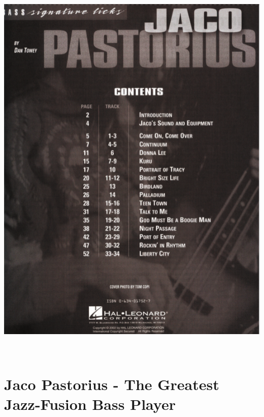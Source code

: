 \documentclass[a4paper]{book}
\begin{document}
\begin{center}
\includegraphics[width=14.76cm,height=19.022cm]{lebluessupportsmethodes-img162.png}
\end{center}
\clearpage\section{Jaco Pastorius - The Greatest Jazz-Fusion Bass
Player}
\end{document}
